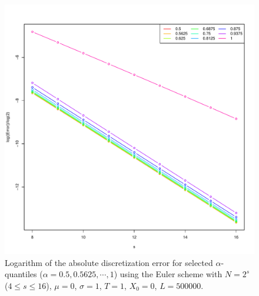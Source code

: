 \documentclass[cjk]{beamer}
\begin{document}
\begin{frame}
 \begin{figure}
   \includegraphics[scale=0.4]{nout_0alog.pdf}
   \caption{Logarithm of the absolute discretization error for selected $\alpha$-quantiles ($\alpha = 0.5, 0.5625, \cdots, 1$) using the Euler scheme with $N = 2^s$ ($4\le s \le 16$), $\mu=0$, $\sigma=1$, $T=1$, $X_0=0$, $L=500000$.} 
   \label{f:lab}
\end{figure}
\end{frame}
\end{document}
